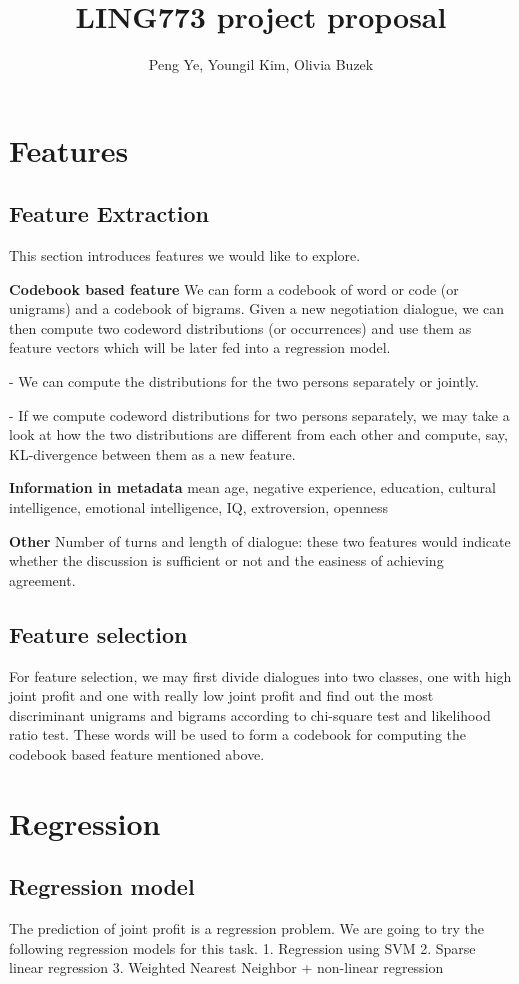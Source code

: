 \documentclass[11pt]{article} %
\title{LING773 project proposal}
\author{Peng Ye, Youngil Kim, Olivia Buzek}
\begin{document}
\maketitle

\section{Features}
\subsection{Feature Extraction}  %
This section introduces features we would like to explore.

\textbf{Codebook based feature}
We can form a codebook of word or code (or unigrams) and a codebook of bigrams. Given a new negotiation dialogue, we can then compute two codeword distributions (or occurrences) and use them as feature vectors which will be later fed into a regression model.

-	We can compute the distributions for the two persons separately or jointly.

-	If we compute codeword distributions for two persons separately, we may take a look at how the two distributions are different from each other and compute, say, KL-divergence between them as a new feature.

\textbf{Information in metadata}
mean age, negative experience, education, cultural intelligence, emotional intelligence, IQ, extroversion, openness

\textbf{Other}
Number of turns and length of dialogue: these two features would indicate whether the discussion is sufficient or not and the easiness of achieving agreement.

\subsection{Feature selection}  %
For feature selection, we may first divide dialogues into two classes, one with high joint profit and one with really low joint profit and find out the most discriminant unigrams and bigrams according to chi-square test and likelihood ratio test. These words will be used to form a codebook for computing the codebook based feature mentioned above.


\section{Regression}
\subsection{Regression model}  %
The prediction of joint profit is a regression problem. We are going to try the following regression models for this task.
1.	Regression using SVM
2.	Sparse linear regression
3.	Weighted Nearest Neighbor + non-linear regression
\end{document}
